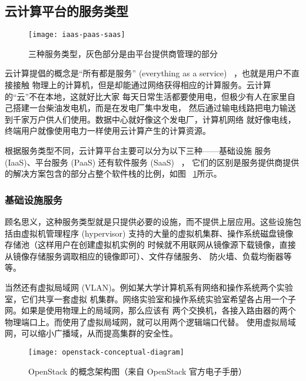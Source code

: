 \subsection{云计算平台的服务类型}

\begin{figure}[h]
    \centering
    \texttt{[image: iaas-paas-saas]}
    \caption{三种服务类型，灰色部分是由平台提供商管理的部分}
    \label{fig:iaas-paas-saas}
\end{figure}

云计算提倡的概念是“所有都是服务”
 (everything as a service) ~\cite{cloud-and-openstack}，也就是用户不直接接触
物理上的计算机，但是却能通过网络获得相应的计算服务。云计算的“云”不在本地，这就好比大家
每天日常生活都要使用电，但极少有人在家里自己搭建一台柴油发电机，而是在发电厂集中发电，
然后通过输电线路把电力输送到千家万户供人们使用。数据中心就好像这个发电厂，计算机网络
就好像电线，终端用户就像使用电力一样使用云计算产生的计算资源。

根据服务类型不同，云计算平台主要可以分为以下三种——基础设施
服务 (IaaS)、平台服务 (PaaS) 还有软件服务 (SaaS) ~\cite{types-of-cloud}，
它们的区别是服务提供商提供的解决方案包含的部分占整个软件栈的比例，如图
~\ref{fig:iaas-paas-saas}所示。

\subsubsection{基础设施服务}
\label{subsubsec:iaas}

顾名思义，这种服务类型就是只提供必要的设施，而不提供上层应用。这些设施包括由虚拟机管理程序
 (hypervisor) 支持的大量的虚拟机集群、操作系统磁盘镜像存储池（这样用户在创建虚拟机实例的
时候就不用联网从镜像源下载镜像，直接从镜像存储服务调取相应的镜像即可）、文件存储服务、
防火墙、负载均衡器等等。

当然还有虚拟局域网 (VLAN)。例如某大学计算机系有网络和操作系统两个实验室，它们共享一套虚拟
机集群。网络实验室和操作系统实验室希望各占用一个子网。如果是使用物理上的局域网，那么应该有
两个交换机，各接入路由器的两个物理端口上。而使用了虚拟局域网，就可以用两个逻辑端口代替。
使用虚拟局域网，可以缩小广播域，从而提高集群的安全性。

\begin{figure}[h]
    \centering
    \texttt{[image: openstack-conceptual-diagram]}
    \caption{OpenStack 的概念架构图（来自 OpenStack 官方电子手册）}
    \label{fig:openstack-conceptual-diagram}
\end{figure}

